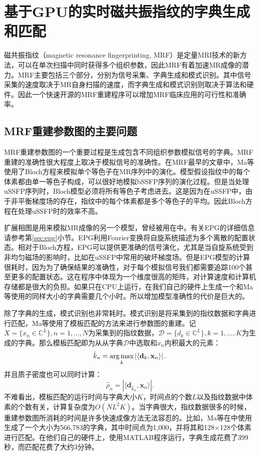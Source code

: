 \chapter{基于GPU的实时磁共振指纹的字典生成和匹配}
\label{chap:snapMRF}
磁共振指纹（magnetic resonance fingerprinting, MRF）是定量MRI技术的新方法，可以在单次扫描中同时获得多个组织参数\cite{mrf,esr,bipin_mehta_magnetic_2019}，因此MRF有着加速MR成像的潜力。MRF主要包括三个部分，分别为信号采集、字典生成和模式识别。其中信号采集的速度取决于MR自身扫描的速度，而字典生成和模式识别则取决于算法和硬件。因此一个快速开源的MRF重建程序可以增加MRF临床应用的可行性和准确率。

\section{MRF重建参数图的主要问题}
MRF重建参数图的一个重要过程是生成包含不同组织参数模拟信号的字典。MRF重建的准确性很大程度上取决于模拟信号的准确性。在MRF最早的文章中，Ma等\cite{mrf}使用了Bloch方程来模拟单个等色子在MR序列中的演化。模型假设指纹中的每个体素都由单一等色子构成，可以很好地模拟bSSFP序列的演化过程。但是当处理uSSFP序列时，Bloch模型必须将所有等色子考虑进去。这是因为在uSSFP中，由于非平衡梯度场的存在，指纹中的每个体素都是多个等色子的平均。因此Bloch方程在处理uSSFP时的效率不高。

扩展相图是用来模拟MR成像的另一个模型，曾经被用在\cite{jiang}中。有关EPG的详细信息请参考第\ref{sec:epg}小节。EPG利用Fourier变换将自旋系统描述为多个离散的配置状态。相对于Bloch方程，EPG可以提供更准确的信号演化，尤其是当自旋系统受到非均匀磁场的影响时，比如在uSSFP中常用的破坏梯度场。但是EPG模型的计算很耗时，因为为了确保结果的准确性，对于每个模拟信号我们都需要追踪100个甚至更多的配置状态。这在程序中体现为一个维度很高的矩阵，对计算速度和计算机存储都是很大的负担。如果只在CPU上运行，在我们自己的硬件上生成一个和Ma等\cite{mrf}使用的同样大小的字典需要几个小时。所以增加模型准确性的代价是巨大的。

除了字典的生成，模式识别也非常耗时。模式识别是将采集到的指纹数据和字典进行匹配，Ma等\cite{mrf}使用了模板匹配的方法来进行参数图的重建。记$X=\{x_n\in \mathbb{C}^L\}, n=1,...,N$为采集到的指纹数据，$\mathcal{D}=\{d_k\in \mathbb{C}^L\},k=1,...,K$为生成的字典。那么模板匹配即为从从字典$\mathcal{D}$中选取和$x_n$内积最大的元素：
	\begin{equation}
	\hat{k}_n = \operatorname*{arg\,max}_k \left|\left\langle \mathbf{d}_k,\mathbf{x}_n \right\rangle \right|.
	\end{equation}
并且质子密度也可以同时计算：
	\begin{equation}
	\hat{\rho}_n=\left|\langle \mathbf{d}_{\hat{k}_n},\mathbf{x}_n \rangle\right|.
	\end{equation}
不难看出，模板匹配的运行时间与字典大小$K$，时间点的个数$L$以及指纹数据中体素的个数有关，计算复杂度为$O(NL^2K)$。当字典很大，指纹数据很多的时候，重建参数图所消耗的时间是许多快速成像方法无法容忍的。比如，Ma等在\cite{mrf}中使用生成了一个大小为566,783的字典，其中时间点为1,000，并将其和128$\times$128个体素进行匹配。在他们自己的硬件上，使用MATLAB程序运行，字典生成花费了399秒，而匹配花费了大约3分钟。

